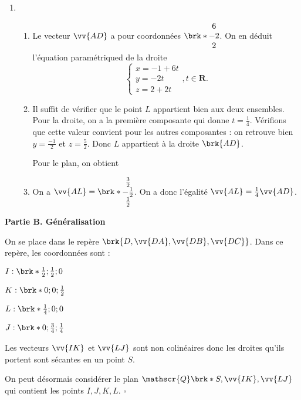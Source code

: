 \documentclass[12pt,a4paper,french]{article}
\newcommand{\R}{\mathbf{R}}
\theoremstyle{break}
\theoremstyle{plain}
\theoremstyle{nonumberplain}
\theoremstyle{nonumberbreak}
\begin{document}
\begin{solution}
\begin{enumerate}
    \item
      \begin{enumerate}
        \item Le vecteur $\vv{AD}$ a pour coordonnées
        $\brk*{\begin{matrix}6 \\ -2 \\ 2\end{matrix}}$. On en déduit
          l'équation paramétriqued de la droite \[ \left\lbrace
            \begin{matrix} x= -1 + 6t \\ y = -2t \\ z=
          2+2t\end{matrix}\right., t\in \R. \]
        \item Il suffit de vérifier que le point $L$ appartient bien aux
          deux ensembles. Pour la droite, on a la première composante
          qui donne $t = \frac14$. Vérifions que cette valeur convient
          pour les autres composantes : on retrouve bien $y =
          \frac{-1}2$ et $z = \frac52$. Donc $L$ appartient à la droite
          $\brk{AD}$.

          Pour le plan, on obtient

        \item On a $\vv{AL} = \brk*{\begin{matrix} \frac32 \\ -\frac12
          \\ \frac12\end{matrix}}$. On a donc l'égalité $\vv{AL} =
          \frac14 \vv{AD}$.
      \end{enumerate}
  \end{enumerate}

  \textbf{Partie B. Généralisation}

  On se place dans le repère $\brk{D,\vv{DA},\vv{DB},\vv{DC}}$. Dans ce
  repère, les coordonnées sont :
  \begin{itemize*}
    \item $I : \brk*{\frac12 ; \frac12 ; 0}$
    \item $K : \brk*{0 ; 0 ; \frac12}$
    \item $L : \brk*{\frac14 ; 0 ; 0}$
    \item $J : \brk*{0 ; \frac34 ; \frac14}$
  \end{itemize*}

  Les vecteurs $\vv{IK}$ et $\vv{LJ}$ sont non colinéaires donc les
  droites qu'ils portent sont sécantes en un point $S$.

  On peut désormais considérer le plan
  $\mathscr{Q}\brk*{S,\vv{IK},\vv{LJ}}$ qui contient les points
  $I,J,K,L$. \hfill$\square$
\end{solution}


\pagebreak
\printsolutions
\end{document}
